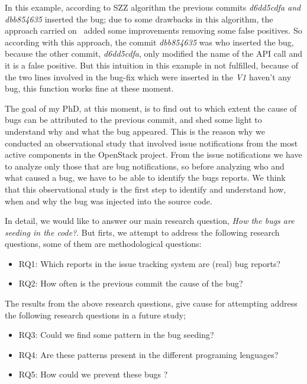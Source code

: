 \documentclass[ifip]{svmult}
\begin{document}
In this example, according to SZZ algorithm the previous commits \textit{d6dd5cdfa and dbb854635} inserted the bug; due to some drawbacks in this algorithm, the approach carried on~\cite{kim2006automatic} added some improvements removing some false positives. So according with this approach, the commit \textit{dbb854635} was who inserted the bug, because the other commit, \textit{d6dd5cdfa}, only modified the name of the API call and it is a false positive. But this intuition in this example in not fulfilled, because of the two lines involved in the bug-fix which were inserted in the \textit{V1} haven't any bug, this function works fine at these moment. 

The goal of my PhD, at this moment, is to find out to which extent the cause of bugs can be attributed to the previous commit, and shed some light to understand why and what the bug appeared. This is the reason why we conducted an observational study that involved issue notifications from the most active components in the OpenStack project. From the issue notifications we have to analyze only those that are bug notifications, so before analyzing who and what caused a bug, we have to be able to identify the bugs reports. We think that this observational study is the first step to identify and understand how, when and why the bug was injected into the source code.

In detail, we would like to answer our main research question, \textit{How the bugs are seeding in the code?}. But firts, we attempt to address the following research questions, some of them are methodological questions:
\begin{itemize}
    \item RQ1:  Which reports in the issue tracking system are (real) bug reports?
    \item RQ2:  How often is the previous commit the cause of the bug?
\end{itemize}

The results from  the above research questions, give cause for attempting address the following research questions in a future study;  
\begin{itemize}
    \item RQ3:  Could we find some pattern in the bug seeding?
    \item RQ4:  Are these patterns present in the different programing lenguages?
    \item RQ5:  How could we prevent these bugs ?
\end{itemize}
\end{document}
